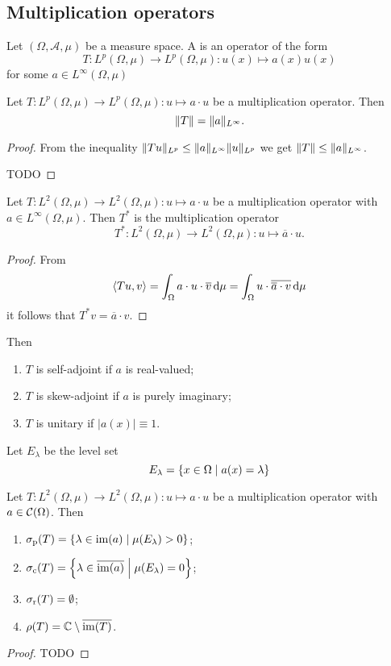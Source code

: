 \subsection{Multiplication operators}
\begin{definition}
Let $(\Omega, \mathcal{A}, \mu)$ be a measure space. A  is an operator of the form
\[ T: L^p(\Omega, \mu) \to L^p(\Omega, \mu): u(x) \mapsto a(x)u(x) \]
for some $a\in L^\infty(\Omega,\mu)$
\end{definition}

\begin{proposition}
Let $T: L^p(\Omega, \mu) \to L^p(\Omega, \mu): u \mapsto a\cdot u$ be a multiplication operator. Then
\[ \lVert T\rVert = \lVert a\rVert_{L^\infty}. \]
\end{proposition}
\begin{proof}
From the inequality $\lVert Tu\rVert_{L^p}\leq \lVert a\rVert_{L^\infty}\lVert u\rVert_{L^p}$ we get $\lVert T\rVert \leq \lVert a\rVert_{L^\infty}$.

TODO
\end{proof}

\begin{lemma}
Let $T: L^2(\Omega, \mu) \to L^2(\Omega, \mu): u \mapsto a\cdot u$ be a multiplication operator with $a\in L^\infty(\Omega,\mu)$. Then $T^*$ is the multiplication operator
\[ T^*: L^2(\Omega, \mu) \to L^2(\Omega, \mu): u \mapsto \overline{a}\cdot u. \]
\end{lemma}
\begin{proof}
From 
\[ \left\langle Tu,v \right\rangle = \int_\Omega a\cdot u \cdot \overline{v}\operatorname{d \!}{\mu} = \int_\Omega u \cdot \overline{\overline{a}\cdot v}\operatorname{d \!}{\mu} \]
it follows that $T^*v = \overline{a}\cdot v$.
\end{proof}
\begin{corollary}
Then
\begin{enumerate}
\item $T$ is self-adjoint if $a$ is real-valued;
\item $T$ is skew-adjoint if $a$ is purely imaginary;
\item $T$ is unitary if $|a(x)| \equiv 1$.
\end{enumerate}
\end{corollary}

Let $E_\lambda$ be the level set
\[ E_\lambda = \left\{ x\in\Omega \;\middle|\; a(x) = \lambda \right\} \]

\begin{proposition}
Let $T: L^2(\Omega, \mu) \to L^2(\Omega, \mu): u\mapsto a\cdot u$ be a multiplication operator with $a\in \operatorname{\mathcal{C}}(\Omega)$. Then
\begin{enumerate}
\item $\sigma_\text{p}(T) = \left\{ \lambda\in \operatorname{im}(a) \;\middle|\; \mu(E_\lambda)>0 \right\}$;
\item $\sigma_\text{c}(T) = \left\{ \lambda\in \overline{\operatorname{im}(a)} \;\middle|\; \mu(E_\lambda) = 0 \right\}$;
\item $\sigma_\text{r}(T) = \emptyset$;
\item $\rho(T) = \mathbb{C}\setminus \overline{\operatorname{im}(T)}$.
\end{enumerate}
\end{proposition}
\begin{proof}
TODO
\end{proof}

